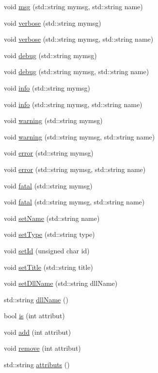 \begin{DoxyCompactItemize}
void \hyperlink{classObject_ac5d59299273cee27aacf7de00d2e7034}{msg} (std::string mymsg, std::string name)
\item 
void \hyperlink{classObject_a83d2db2df682907ea1115ad721c1c4a1}{verbose} (std::string mymsg)
\item 
void \hyperlink{classObject_a2d4120195317e2a3c6532e8bb9f3da68}{verbose} (std::string mymsg, std::string name)
\item 
void \hyperlink{classObject_aac010553f022165573714b7014a15f0d}{debug} (std::string mymsg)
\item 
void \hyperlink{classObject_a6c9a0397ca804e04d675ed05683f5420}{debug} (std::string mymsg, std::string name)
\item 
void \hyperlink{classObject_a644fd329ea4cb85f54fa6846484b84a8}{info} (std::string mymsg)
\item 
void \hyperlink{classObject_a1ca123253dfd30fc28b156f521dcbdae}{info} (std::string mymsg, std::string name)
\item 
void \hyperlink{classObject_a65cd4fda577711660821fd2cd5a3b4c9}{warning} (std::string mymsg)
\item 
void \hyperlink{classObject_a11f101db4dd73d9391b0231818881d86}{warning} (std::string mymsg, std::string name)
\item 
void \hyperlink{classObject_a204a95f57818c0f811933917a30eff45}{error} (std::string mymsg)
\item 
void \hyperlink{classObject_ad7f6c457733082efa2f9ff5f5c8e119a}{error} (std::string mymsg, std::string name)
\item 
void \hyperlink{classObject_aad5a16aac7516ce65bd5ec02ab07fc80}{fatal} (std::string mymsg)
\item 
void \hyperlink{classObject_ae62acd3d09f716220f75f252dc38bc9a}{fatal} (std::string mymsg, std::string name)
\item 
void \hyperlink{classObject_ae30fea75683c2d149b6b6d17c09ecd0c}{setName} (std::string name)
\item 
void \hyperlink{classObject_aae534cc9d982bcb9b99fd505f2e103a5}{setType} (std::string type)
\item 
void \hyperlink{classObject_a398fe08cba594a0ce6891d59fe4f159f}{setId} (unsigned char id)
\item 
void \hyperlink{classObject_a89557dbbad5bcaa02652f5d7fa35d20f}{setTitle} (std::string title)
\item 
void \hyperlink{classObject_a870c5af919958c2136623b2d7816d123}{setDllName} (std::string dllName)
\item 
std::string \hyperlink{classObject_a2e3947f2870094c332d7454117f3ec63}{dllName} ()
\item 
bool \hyperlink{classAttrib_a704f26af560909ad22065083bb7d4c34}{is} (int attribut)
\item 
void \hyperlink{classAttrib_a235f773af19c900264a190b00a3b4ad7}{add} (int attribut)
\item 
void \hyperlink{classAttrib_a7d4ef7e32d93cb287792b87b857e79f3}{remove} (int attribut)
\item 
std::string \hyperlink{classAttrib_aee7bbf16b144887f196e1341b24f8a26}{attributs} ()
\end{DoxyCompactItemize}
